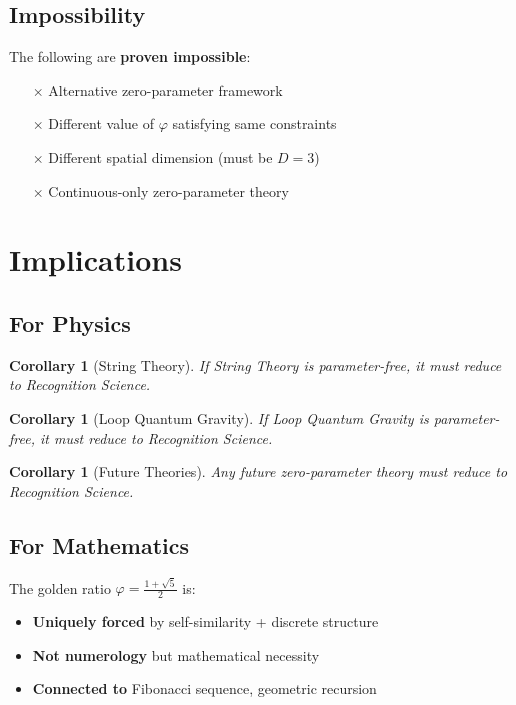 \documentclass[11pt]{article}
\newtheorem{corollary}[theorem]{Corollary}
\theoremstyle{definition}
\theoremstyle{remark}
\begin{document}
\subsection{Impossibility}

The following are \textbf{proven impossible}:

\begin{itemize}
\item[$\times$] Alternative zero-parameter framework
\item[$\times$] Different value of $\varphi$ satisfying same constraints
\item[$\times$] Different spatial dimension (must be $D=3$)
\item[$\times$] Continuous-only zero-parameter theory
\end{itemize}

\section{Implications}

\subsection{For Physics}

\begin{corollary}[String Theory]
If String Theory is parameter-free, it must reduce to Recognition Science.
\end{corollary}

\begin{corollary}[Loop Quantum Gravity]
If Loop Quantum Gravity is parameter-free, it must reduce to Recognition Science.
\end{corollary}

\begin{corollary}[Future Theories]
Any future zero-parameter theory must reduce to Recognition Science.
\end{corollary}

\subsection{For Mathematics}

The golden ratio $\varphi = \frac{1+\sqrt{5}}{2}$ is:
\begin{itemize}
\item \textbf{Uniquely forced} by self-similarity + discrete structure
\item \textbf{Not numerology} but mathematical necessity
\item \textbf{Connected to} Fibonacci sequence, geometric recursion
\end{itemize}
\end{document}
